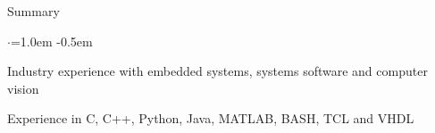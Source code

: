 \documentclass{resume} %
\begin{document}
	
	
	\begin{rSection}{Summary}
		\vspace {0.5em}
		\begin{list}{$\cdot$}{\leftmargin=1.0em}
			\itemsep -0.5em \vspace{-0.5em}
			\item Industry experience with embedded systems, systems software and computer vision
			\item Experience in C, C++, Python, Java, MATLAB, BASH, TCL and VHDL			
		\end{list}
		\vspace{0.5em}
	\end{rSection}
	
	
\end{document}

